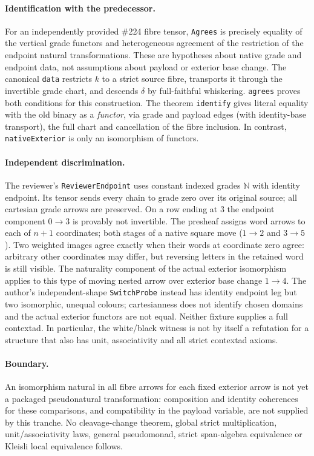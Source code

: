 \documentclass{article}
\begin{document}
\paragraph{Identification with the predecessor.} For an independently
provided \#224 fibre tensor, \texttt{Agrees} is precisely equality of
the vertical grade functors and heterogeneous agreement of the restriction
of the endpoint natural transformations. These are hypotheses about
native grade and endpoint data, not assumptions about payload or exterior
base change. The canonical \texttt{data} restricts $k$ to a strict
source fibre, transports it through the invertible grade chart, and
descends $\delta$ by full-faithful whiskering. \texttt{agrees} proves
both conditions for this construction. The theorem
\texttt{identify} gives literal equality with the old binary as a
\emph{functor}, via grade and payload edges (with identity-base
transport), the full chart and cancellation of the fibre inclusion.
In contrast, \texttt{nativeExterior} is only an isomorphism of functors.
\paragraph{Independent discrimination.} The reviewer's \texttt{ReviewerEndpoint}
uses constant indexed grades $\mathbb N$ with identity endpoint. Its
tensor sends every chain to grade zero over its original source; all
cartesian grade arrows are preserved. On a row ending at 3 the endpoint
component $0\to3$ is provably not invertible. The presheaf assigns
word arrows to each of $n+1$ coordinates; both stages of a native square
move ($1\to2$ and $3\to5$). Two weighted images agree exactly when
their words at coordinate zero agree: arbitrary other coordinates may
differ, but reversing letters in the retained word is still visible.
The naturality component of the actual exterior isomorphism applies to
this type of moving nested arrow over exterior base change $1\to4$.
The author's independent-shape \texttt{SwitchProbe} instead has identity
endpoint leg but two isomorphic, unequal colours; cartesianness does not
identify chosen domains and the actual exterior functors are not equal.
Neither fixture supplies a full contextad. In particular, the white/black
witness is not by itself a refutation for a structure that also has
unit, associativity and all strict contextad axioms.
\paragraph{Boundary.} An isomorphism natural in all fibre arrows for
each fixed exterior arrow is not yet a packaged pseudonatural
transformation: composition and identity coherences for these
comparisons, and compatibility in the payload variable, are not supplied
by this tranche. No cleavage-change theorem, global strict multiplication,
unit/associativity laws, general pseudomonad, strict span-algebra
equivalence or Kleisli local equivalence follows.
\end{document}
